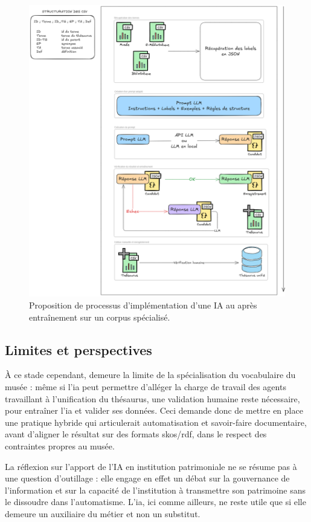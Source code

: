 \begin{figure}
	\centering
	\includegraphics[width=0.7\linewidth]{img/SCHEM_processus_IA}
	\caption[Proposition de processus d'implémentation d'une IA au \mae]{Proposition de processus d'implémentation d'une IA au \mae après entraînement sur un corpus spécialisé.}
	\label{fig:schemprocessusia}
\end{figure}



\subsection{Limites et perspectives}

À ce stade cependant, demeure la limite de la spécialisation du vocabulaire du musée : même si l'\ac{ia} peut permettre d'alléger la charge de travail des agents travaillant à l'unification du thésaurus, une validation humaine reste nécessaire, pour entraîner l'\ac{ia} et valider ses données. Ceci demande donc de mettre en place une pratique hybride qui articulerait automatisation et savoir-faire documentaire, avant d'aligner le résultat sur des formats \ac{skos}/\ac{rdf}, dans le respect des contraintes propres au musée.

La réflexion sur l’apport de l’IA en institution patrimoniale ne se résume pas à une question d’outillage : elle engage en effet un débat sur la gouvernance de l’information et sur la capacité de l’institution à transmettre son patrimoine sans le dissoudre dans l’automatisme. L'\ac{ia}, ici comme ailleurs, ne reste utile que si elle demeure un auxiliaire du métier et non un substitut. 